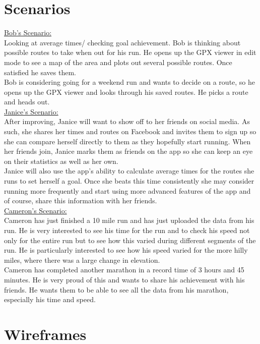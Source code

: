 \documentclass{article}
\begin{document}
\section{Scenarios}
\label{sec:scenario}
\underline{Bob's Scenario:}\\
Looking at average times/ checking goal achievement.
Bob is thinking about possible routes to take when out for his run. He opens up the GPX viewer in edit mode to see a map of the area and plots out several possible routes. Once satisfied he saves them.\\
Bob is considering going for a weekend run and wants to decide on a route, so he opens up the GPX viewer and looks through his saved routes. He picks a route and heads out.\\
\underline{Janice's Scenario:}\\
After improving, Janice will want to show off to her friends on social media. As such, she shares her times and routes on Facebook and invites them to sign up so she can compare herself directly to them as they hopefully start running. When her friends join, Janice marks them as friends on the app so she can keep an eye on their statistics as well as her own.\\
Janice will also use the app’s ability to calculate average times for the routes she runs to set herself a goal. Once she beats this time consistently she may consider running more frequently and start using more advanced features of the app and of course, share this information with her friends.\\
\underline{Cameron's Scenario:}\\
Cameron has just finished a 10 mile run and has just uploaded the data from his run. He is very interested to see his time for the run and to check his speed not only for the entire run but to see how this varied during different segments of the run. He is particularly interested to see how his speed varied for the more hilly miles, where there was a large change in elevation.\\
Cameron has completed another marathon in a record time of 3 hours and 45 minutes. He is very proud of this and wants to share his achievement with his friends. He wants them to be able to see all the data from his marathon, especially his time and speed.\\

\section{Wireframes}
\label{sec:wire}
\end{document}
